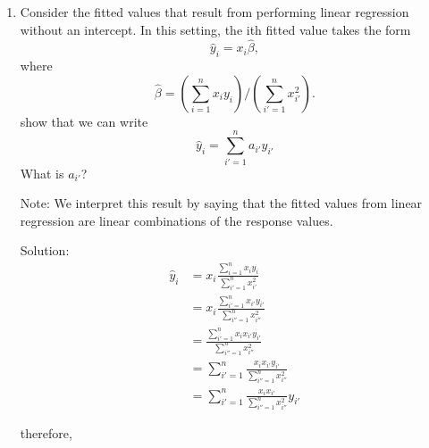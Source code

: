 \documentclass{article}
\begin{document}
\begin{enumerate}
\begin{enumerate}
\item Answer (a) using test rather than training RSS.

Solution: Though we could not be certain, the test RSS would likely be higher due to
overfitting.

\item Suppose that the true relationship between $X$ and $Y$ is not linear, but
   we don't know how far it is from linear. Consider the training RSS for the
    linear regression, and also the training RSS for the cubic regression.
    Would we expect one to be lower than the other, would we expect them to be
    the same, or is there not enough information to tell? Justify your answer.

Solution: You would expect the cubic regression to have lower RSS since it is at least
as flexible as the linear regression.

\item Answer (c) using test rather than training RSS.

Solution: There is not enough information to tell, it depends on how non-linear the 
true relationship is.
\end{enumerate}

\item Consider the fitted values that result from performing linear regression
 without an intercept. In this setting, the ith fitted value takes the form
 $$\hat{y}_i = x_i\hat\beta,$$
 where
 $$\hat{\beta} = \left(\sum_{i=1}^nx_iy_i\right) / \left(\sum_{i' = 1}^n x^2_{i'}\right).$$
 show that we can write
 $$\hat{y}_i = \sum_{i' = 1}^na_{i'}y_{i'}$$
 What is $a_{i'}$?

Note: We interpret this result by saying that the fitted 
values from linear regression are linear combinations of the response values.

Solution:
\begin{align}
\hat{y}_i 
  & = x_i \frac{\sum_{i=1}^nx_iy_i}{\sum_{i' = 1}^n x^2_{i'}} \\
  & = x_i \frac{\sum_{i'=1}^nx_{i'}y_{i'}}{\sum_{i'' = 1}^n x^2_{i''}} \\
  & = \frac{\sum_{i'=1}^n x_i x_{i'}y_{i'}}{\sum_{i'' = 1}^n x^2_{i''}} \\
  & = \sum_{i'=1}^n  \frac{ x_i x_{i'}y_{i'}}{\sum_{i'' = 1}^n x^2_{i''}} \\
  & = \sum_{i'=1}^n  \frac{ x_i x_{i'}}{\sum_{i'' = 1}^n x^2_{i''}} y_{i'}
\end{align}

therefore,


\end{enumerate}
\end{document}
